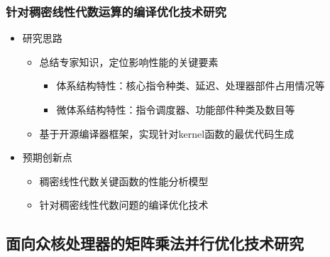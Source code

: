 \documentclass[aspectratio=169]{beamer}
\begin{document}
\begin{frame}
  \frametitle{针对稠密线性代数运算的编译优化技术研究}
  \begin{itemize}
  \item 研究思路
    \begin{itemize}
    \item 总结专家知识，定位影响性能的关键要素
      \begin{itemize}
      \item 体系结构特性：核心指令种类、延迟、处理器部件占用情况等
      \item 微体系结构特性：指令调度器、功能部件种类及数目等
      \end{itemize}
    \item 基于开源编译器框架，实现针对kernel函数的最优代码生成
    \end{itemize}
  \item 预期创新点
    \begin{itemize}
    \item 稠密线性代数关键函数的性能分析模型
    \item 针对稠密线性代数问题的编译优化技术
    \end{itemize}
  \end{itemize}
\end{frame}

\subsection[并行可扩展性研究]{面向众核处理器的矩阵乘法并行优化技术研究}
\end{document}
